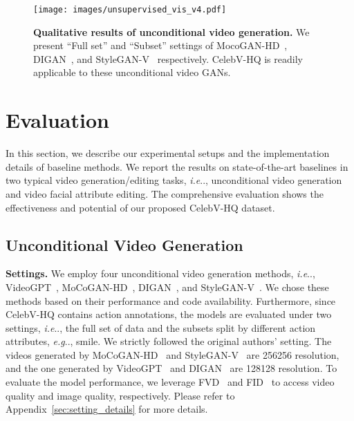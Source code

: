 \documentclass[runningheads]{llncs}
\makeatletter
\DeclareRobustCommand\onedot{\futurelet\@let@token\@onedot}
\def\@onedot{\ifx\@let@token.\else.\null\fi\xspace}
\def\eg{\emph{e.g}\onedot} \def\Eg{\emph{E.g}\onedot}
\def\ie{\emph{i.e}\onedot} \def\Ie{\emph{I.e}\onedot}
\makeatother
\begin{document}
\begin{figure*}[t]
    \centering
    \texttt{[image: images/unsupervised\_vis\_v4.pdf]}
\caption{\textbf{Qualitative results of unconditional video generation.} We present ``Full set'' and ``Subset'' settings of MocoGAN-HD~\cite{mocoganhd}, DIGAN~\cite{digan}, and StyleGAN-V~\cite{styleganv} respectively. CelebV-HQ is readily applicable to these unconditional video GANs. }
    \label{fig:unsupervised}
\end{figure*}

\section{Evaluation}
In this section, we describe our experimental setups and the implementation details of baseline methods. We report the results on state-of-the-art baselines in two typical video generation/editing tasks, \ie, unconditional video generation and video facial attribute editing. 
The comprehensive evaluation shows the effectiveness and potential of our proposed CelebV-HQ dataset.


\subsection{Unconditional Video Generation}
\begin{sloppypar}
\noindent
\textbf{Settings.} We employ four unconditional video generation methods, \ie, VideoGPT~\cite{yan2021videogpt}, MoCoGAN-HD~\cite{mocoganhd}, DIGAN~\cite{digan}, and StyleGAN-V~\cite{styleganv}. We chose these methods based on their performance and code availability.
Furthermore, since CelebV-HQ contains action annotations, the models are evaluated under two settings, \ie, the full set of data and the subsets split by different action attributes, \eg, smile. 
We strictly followed the original authors' setting. The videos generated by MoCoGAN-HD~\cite{mocoganhd} and StyleGAN-V~\cite{styleganv} are 256256 resolution, and the one generated by VideoGPT~\cite{yan2021videogpt} and DIGAN~\cite{digan} are 128128 resolution.
To evaluate the model performance, we leverage FVD~\cite{fvd} and FID~\cite{fid} to access video quality and image quality, respectively. Please refer to Appendix~\ref{sec:setting_details} for more details.
\end{sloppypar}
\end{document}
